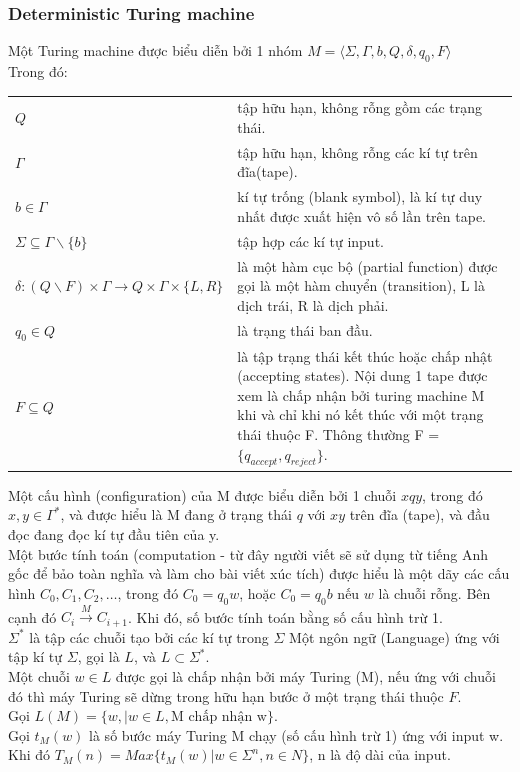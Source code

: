 \documentclass[a4paper 14pt]{extarticle}
\begin{document}
			\subsubsection{Deterministic Turing machine}
				Một Turing machine được biểu diễn bởi 1 nhóm $M = \langle \Sigma, \Gamma, b, Q, \delta, q_0, F \rangle$\\
				Trong đó:\\
				\begin{tabular}{l p{4in}}
					$Q$& tập hữu hạn, không rỗng gồm các trạng thái.\\
					$\Gamma$& tập hữu hạn, không rỗng các kí tự trên đĩa(tape).\\
					$b \in \Gamma$& kí tự trống (blank symbol), là kí tự duy nhất được xuất hiện vô số lần trên tape.\\
					$\Sigma \subseteq \Gamma \backslash \{b\}$& tập hợp các kí tự input.\\
					$\delta: (Q \backslash F) \times \Gamma \to Q \times \Gamma \times \{L, R\} $& là một hàm cục bộ (partial function) được gọi là một hàm chuyển (transition), L là dịch trái, R là dịch phải.\\
					$q_{0} \in Q$& là trạng thái ban đầu.\\
					$F\subseteq Q$& là tập trạng thái kết thúc hoặc chấp nhật (accepting states). Nội dung 1 tape được xem là chấp nhận bởi turing machine M khi và chỉ khi nó kết thúc với một trạng thái thuộc F. Thông thường F = $\{q_{accept}, q_{reject}\}$.\\
				\end{tabular}  
				Một cấu hình (configuration) của M được biểu diễn bởi 1 chuỗi $xqy$, trong đó $x, y \in \Gamma^{*}$, và được hiểu là M đang ở trạng thái $q$ với $xy$ trên đĩa (tape), và đầu đọc đang đọc kí tự đầu tiên của y.\\
				Một bước tính toán (computation - từ đây người viết sẽ sử dụng từ tiếng Anh gốc để bảo toàn nghĩa và làm cho bài viết xúc tích) được hiểu là một dãy các cấu hình $C_0, C_1, C_2, \hdots$, trong đó $C_0 = q_0w$, hoặc $C_0 = q_0b$ nếu $w$ là chuỗi rỗng. Bên cạnh đó $C_i \overset{M}{\to} C_{i+1}$. Khi đó, số bước tính toán bằng số cấu hình trừ 1.\\
				$\Sigma^*$ là tập các chuỗi tạo bởi các kí tự trong $\Sigma$
				Một ngôn ngữ (Language) ứng với tập kí tự $\Sigma$, gọi là $L$, và $L\subset \Sigma^*$.\\
				Một chuỗi $w \in L$ được gọi là chấp nhận bởi máy Turing (M), nếu ứng với chuỗi đó thì máy Turing sẽ dừng trong hữu hạn bước ở một trạng thái thuộc $F$.\\
				Gọi $L(M) = \{w, | w \in L,\text{M chấp nhận w} \}$.\\
				Gọi $t_M(w)$ là số bước máy Turing M chạy (số cấu hình trừ 1) ứng với input w.\\
				Khi đó $T_M(n) = Max\{t_M(w) | w \in \Sigma^n, n \in N\}$, n là độ dài của input. 
\end{document}
